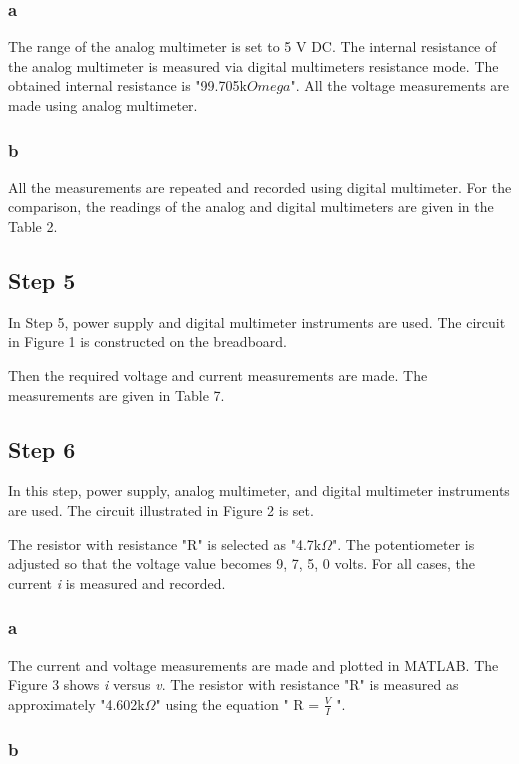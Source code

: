 \documentclass[letterpaper,12pt]{article}
\begin{document}
\subsubsection{a}
The  range of the analog multimeter is set to 5 V DC. The internal resistance of the analog multimeter is measured via digital multimeters resistance mode. The obtained internal resistance is "99.705k\(Omega\)". All the voltage measurements are made using analog multimeter.
\subsubsection{b}
All the measurements are repeated and recorded using digital multimeter. For the comparison, the readings of the analog and digital multimeters are given in the Table 2.
  

\subsection{Step 5}
In Step 5, power supply and digital multimeter instruments are used. The circuit in Figure 1 is constructed on the breadboard. 

Then the required voltage and current measurements are made. The measurements are given in Table 7.


\subsection{Step 6}
In this step, power supply, analog multimeter, and digital multimeter instruments are used. The circuit illustrated in Figure 2 is set. 


The resistor with resistance "R" is selected as "4.7k\(\Omega\)". The potentiometer is adjusted so that the voltage value becomes 9, 7, 5, 0 volts. For all cases, the current \emph{i} is measured and recorded.

\subsubsection{a}
The current and voltage measurements are made and plotted in MATLAB. The Figure 3 shows  \emph{i} versus \emph{v}. The resistor with resistance "R" is measured as approximately "4.602k\(\Omega\)" using the equation " R  = \(\frac{V}{I}\) ".




\subsubsection{b}
\end{document}
